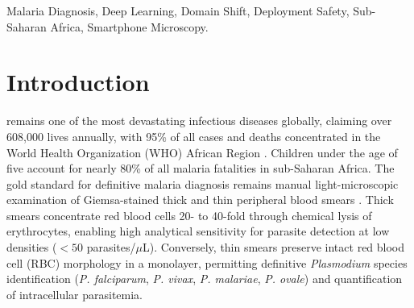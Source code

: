 \documentclass[10pt,journal,compsoc]{IEEEtran}
\begin{document}
\begin{abstract}
Our benchmark executes 16,216 zero-shot inference evaluations. We reveal three critical findings: (1) an African Regional Advantage, wherein the African-trained \texttt{MS\_Sudan} model achieves a 5.0-fold higher specificity on thin smears ($58.82\%$ vs. $11.76\%$), cutting the false-positive diagnostic rate by more than half (a $2.14\times$ reduction, from $88.24\%$ down to $41.18\%$; two-tailed Fisher's exact $p = 9.50 \times 10^{-7} < 0.0001$) relative to Asian-trained architectures; (2) Architectural Divergence under Modality Transfer, where the leading thick-smear spatial object detector (\texttt{YOLOv8}, 87.43\% sensitivity) suffers an acute 23.37 percentage-point collapse on thin smears (64.06\% sensitivity; Fisher's exact $p = 5.45 \times 10^{-54}$) due to intact erythrocyte membrane occlusions, whereas whole-slide MobileNetV2 classifiers remain stable or slightly improve; and (3) an Optical Quality Vulnerability, where severe focus blur induces up to a 25.37 percentage-point drop in detection performance. We translate these empirical failure modes into quantitative deployment-safety thresholds, establishing mandatory pre-inference focus quality gating, regional calibration, and explicit sample-size constraints before clinical AI integration in sub-Saharan Africa.
\end{abstract}

\begin{IEEEkeywords}
Malaria Diagnosis, Deep Learning, Domain Shift, Deployment Safety, Sub-Saharan Africa, Smartphone Microscopy.
\end{IEEEkeywords}

\section{Introduction}
 remains one of the most devastating infectious diseases globally, claiming over 608,000 lives annually, with 95\% of all cases and deaths concentrated in the World Health Organization (WHO) African Region \cite{kabore2025addressing}. Children under the age of five account for nearly 80\% of all malaria fatalities in sub-Saharan Africa. The gold standard for definitive malaria diagnosis remains manual light-microscopic examination of Giemsa-stained thick and thin peripheral blood smears \cite{yu2020malaria, who2016malaria}. 
Thick smears concentrate red blood cells 20- to 40-fold through chemical lysis of erythrocytes, enabling high analytical sensitivity for parasite detection at low densities ($<50$ parasites/$\mu$L). Conversely, thin smears preserve intact red blood cell (RBC) morphology in a monolayer, permitting definitive \textit{Plasmodium} species identification (\textit{P. falciparum}, \textit{P. vivax}, \textit{P. malariae}, \textit{P. ovale}) and quantification of intracellular parasitemia.
\end{document}
